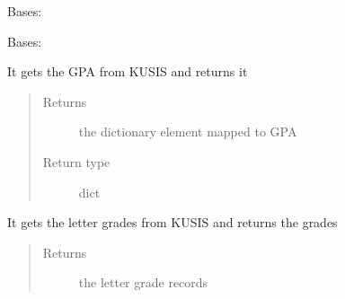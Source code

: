 \documentclass[letterpaper,10pt,english]{sphinxmanual}
\begin{document}
\begin{fulllineitems}
\label{\detokenize{KusisAPI:KusisAPI.AcademicRecord}}
\pysigstartsignatures
{}
\pysigstopsignatures
\sphinxAtStartPar
Bases: 

\end{fulllineitems}


\begin{fulllineitems}
\label{\detokenize{KusisAPI:KusisAPI.KusisAPI}}
\pysigstartsignatures
{}
\pysigstopsignatures
\sphinxAtStartPar
Bases: 

\begin{fulllineitems}
\label{\detokenize{KusisAPI:KusisAPI.KusisAPI.getGPA}}
\pysigstartsignatures
{}
\pysigstopsignatures
\sphinxAtStartPar
It gets the GPA from KUSIS and returns it
\begin{quote}\begin{description}
\item[{Returns}] \leavevmode
\sphinxAtStartPar
the dictionary element mapped to GPA

\item[{Return type}] \leavevmode
\sphinxAtStartPar
dict

\end{description}\end{quote}

\end{fulllineitems}


\begin{fulllineitems}
\label{\detokenize{KusisAPI:KusisAPI.KusisAPI.getLetterGrades}}
\pysigstartsignatures
{}
\pysigstopsignatures
\sphinxAtStartPar
It gets the letter grades from KUSIS and returns the grades
\begin{quote}\begin{description}
\item[{Returns}] \leavevmode
\sphinxAtStartPar
the letter grade records


\end{description}
\end{quote}
\end{fulllineitems}
\end{fulllineitems}
\end{document}
